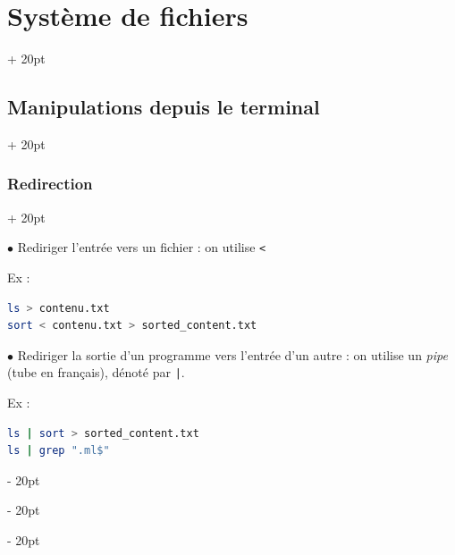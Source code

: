 \documentclass[a4paper, 12pt, twoside]{article}
\newcommand{\ind}[1][20pt]{\advance\leftskip + #1}
\newcommand{\deind}[1][20pt]{\advance\leftskip - #1}
\newenvironment{indentedenv}[1][20pt]{\par \ind[#1]}{\par \deind}
\newenvironment{indt}[2][20pt]{#2 \begin{indentedenv}[#1]}{\end{indentedenv}} %
\begin{document}
\begin{indt}{\section{Système de fichiers}}
\begin{indt}{\subsection{Manipulations depuis le terminal}}
\begin{indt}{\subsubsection{Redirection}}
                \vspace{12pt}
                
                $\bullet$ Rediriger l'entrée vers un fichier : on utilise \texttt <
                
                Ex :
                \begin{lstlisting}[language=Bash, xleftmargin=80pt]
ls > contenu.txt
sort < contenu.txt > sorted_content.txt\end{lstlisting}
                
                \vspace{12pt}
                
                $\bullet$ Rediriger la sortie d'un programme vers l'entrée d'un autre : on utilise un \textit{pipe} (tube en français), dénoté par \texttt{|}.
                
                Ex :
                \begin{lstlisting}[language=Bash, xleftmargin=80pt]
ls | sort > sorted_content.txt
ls | grep ".ml$"\end{lstlisting}
                
            \end{indt}
        \end{indt}
        
    \end{indt}
    
    \vspace{12pt}
    
\end{document}
